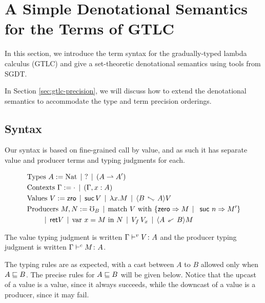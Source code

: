 \section{A Simple Denotational Semantics for the Terms of GTLC}\label{sec:gtlc-terms}

In this section, we introduce the term syntax for the gradually-typed
lambda calculus (GTLC) and give a set-theoretic denotational semantics
using tools from SGDT.

In Section \ref{sec:gtlc-precision}, we will discuss how to extend the denotational
semantics to accommodate the type and term precision orderings.


\subsection{Syntax}\label{sec:term-syntax}

Our syntax is based on fine-grained call by value, and as such it has
separate value and producer terms and typing judgments for each.



\begin{align*}
  &\text{Types } A := \nat \alt \,\dyn \alt (A \ra A') \\
  &\text{Contexts } \Gamma := \cdot \alt (\Gamma, x : A) \\
  &\text{Values } V :=  \zro \alt \suc\, V \alt \lda{x}{M} \alt \up{A}{B} V \\ 
  &\text{Producers } M, N := \err_B \alt \matchnat {V} {M} {n} {M'} \\ 
  &\quad\quad \alt \ret {V} \alt \bind{x}{M}{N} \alt V_f\, V_x \alt \dn{A}{B} M 
\end{align*}


The value typing judgment is written ${\Gamma} \vdash^v {V} \colon {A}$ and 
the producer typing judgment is written ${\Gamma} \vdash^c {M} \colon {A}$.

The typing rules are as expected, with a cast between $A$ to $B$ allowed only when $A \sqsubseteq B$.
The precise rules for $A \sqsubseteq B$ will be given below.
Notice that the upcast of a value is a value, since it always succeeds, while the downcast
of a value is a producer, since it may fail.

